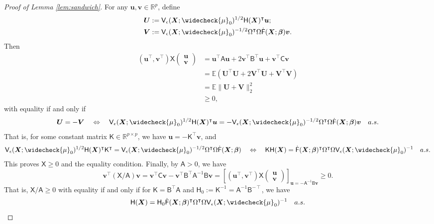 \documentclass[11pt]{article}
\numberwithin{equation}{section}
\theoremstyle{definition}
\theoremstyle{remark}
\newcommand{\bu}{\bm{u}}
\newcommand{\bv}{\bm{v}}
\newcommand{\bU}{\bm{U}}
\newcommand{\bV}{\bm{V}}
\newcommand{\bX}{\bm{X}}
\newcommand{\bbeta}{\bm{\beta}}
\newcommand{\bbE}{\mathbb{E}}
\newcommand{\bbR}{\mathbb{R}}
\newcommand{\sfA}{\mathsf{A}}
\newcommand{\sfB}{\mathsf{B}}
\newcommand{\sfC}{\mathsf{C}}
\newcommand{\sfF}{\mathsf{F}}
\newcommand{\sfH}{\mathsf{H}}
\newcommand{\sfK}{\mathsf{K}}
\newcommand{\sfV}{\mathsf{V}}
\newcommand{\sfX}{\mathsf{X}}
\begin{document}
\begin{proof}[Proof of Lemma \ref{lem:sandwich}]
	For any $ \bu,\bv \in \bbR^{p} $, define
	\begin{align*}
		\bU &:= \sfV_{\epsilon}(\bX;\widecheck{\mu}_{0})^{1/2}\sfH(\bX)^{\intercal}\bu;\\
		\bV &:= \sfV_{\epsilon}(\bX;\widecheck{\mu}_{0})^{-1/2}\Omega^{\intercal}\Omega\dot{\sfF}(\bX;\bbeta)\bv.
	\end{align*}
	Then
	\begin{align*}
		(\bu^{\intercal},\bv^{\intercal})\sfX\begin{pmatrix}
			\bu \\ \bv
		\end{pmatrix} &= \bu^{\intercal}\sfA\bu + 2\bv^{\intercal}\sfB^{\intercal}\bu + \bv^{\intercal}\sfC\bv\\
		&= \bbE(\bU^{\intercal}\bU + 2\bV^{\intercal}\bU + \bV^{\intercal}\bV)\\
		&= \bbE\|\bU + \bV\|_{2}^{2}\\
		&\ge 0,
	\end{align*}
	with equality if and only if 
	\[ \bU = -\bV \quad \Leftrightarrow \quad \sfV_{\epsilon}(\bX;\widecheck{\mu}_{0})^{1/2}\sfH(\bX)^{\intercal}\bu = - \sfV_{\epsilon}(\bX;\widecheck{\mu}_{0})^{-1/2}\Omega^{\intercal}\Omega\dot{\sfF}(\bX;\bbeta)\bv \quad a.s. \]
	That is, for some constant matrix $ \sfK \in \bbR^{p \times p} $, we have $ \bu = -\sfK^{\intercal}\bv $, and
	\begin{align*}
		\sfV_{\epsilon}(\bX;\widecheck{\mu}_{0})^{1/2}\sfH(\bX)^{\intercal}\sfK^{\intercal} = \sfV_{\epsilon}(\bX;\widecheck{\mu}_{0})^{-1/2}\Omega^{\intercal}\Omega\dot{\sfF}(\bX;\bbeta) \quad \Leftrightarrow \quad \sfK\sfH(\bX) = \dot{\sfF}(\bX;\bbeta)^{\intercal}\Omega^{\intercal}\Omega\sfV_{\epsilon}(\bX;\widecheck{\mu}_{0})^{-1} \quad a.s.
	\end{align*}
	This proves $ \sfX \ge 0 $ and the equality condition. Finally, by $ \sfA > 0 $, we have
	\[ \bv^{\intercal}(\sfX/\sfA)\bv = \bv^{\intercal}\sfC\bv - \bv^{\intercal}\sfB^{\intercal}\sfA^{-1}\sfB\bv = \left[ (\bu^{\intercal},\bv^{\intercal})\sfX\begin{pmatrix}
		\bu \\ \bv
	\end{pmatrix} \right]_{\bu = -\sfA^{-1}\sfB\bv} \ge 0. \]
	That is, $ \sfX/\sfA \ge 0 $ with equality if and only if for $ \sfK = \sfB^{\intercal}\sfA $ and $ \sfH_{0} := \sfK^{-1} = \sfA^{-1}\sfB^{-\intercal} $, we have
	\[ \sfH(\bX) = \sfH_{0}\dot{\sfF}(\bX;\bbeta)^{\intercal}\Omega^{\intercal}\Omega\sfV_{\epsilon}(\bX;\widecheck{\mu}_{0})^{-1} \quad a.s. \]
\end{proof}
\end{document}
